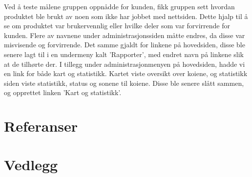\documentclass[12pt,a4paper,norsk]{article}
\begin{document}
Ved å teste målene gruppen oppnådde for kunden, fikk gruppen sett hvordan produktet ble brukt av noen som ikke har jobbet med nettsiden. Dette hjalp til å se om produktet var brukervennlig eller hvilke deler som var forvirrende for kunden. Flere av navnene under administrasjonssiden måtte endres, da disse var misvisende og forvirrende. Det samme gjaldt for linkene på hovedsiden, disse ble senere lagt til i en undermeny kalt 'Rapporter', med endret navn på linkene slik at de tilhørte der. I tillegg under administrasjonmenyen på hovedsiden, hadde vi en link for både kart og statistikk. Kartet viste oversikt over koiene, og statistikk siden viste statistikk, status og sonene til koiene. Disse ble senere slått sammen, og opprettet linken 'Kart og statistikk'.

\newpage
{}
\section{Referanser}


\section{Vedlegg}









%
%
\end{document}
